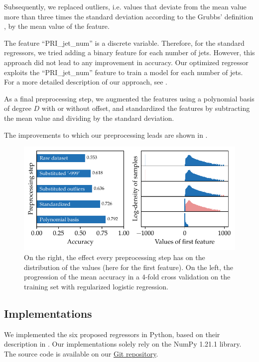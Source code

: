 \documentclass[11pt, a4paper, twocolumn]{article}
\begin{document}
Subsequently, we replaced outliers, i.e. values that deviate  from the mean value more than three times the standard deviation according to the Grubbs' definition \cite{Grubbs69}, by the mean value of the feature. 

The feature  \enquote{PRI\_jet\_num}  is a discrete variable. Therefore, for the standard regressors, we tried adding a binary feature for each number of jets. However, this approach did not lead to any improvement in accuracy.  Our optimized regressor exploits the \enquote{PRI\_jet\_num} feature to train a model for each number of jets. For a more detailed description of our approach, see .

As a final preprocessing step, we augmented the features using a polynomial basis of degree $D$ with or without offset, and standardized the features by subtracting the mean value and dividing by the standard deviation.

The improvements to which our preprocessing leads are shown in .
\begin{figure}[htp]
    \centering
    \includegraphics[width=\columnwidth]{figures/preprocessing.pdf}
    \caption{On the right, the effect every preprocessing step has on the distribution of the values (here for the first feature). On the left, the progression of the mean accuracy in a 4-fold cross validation on the training set with regularized logistic regression.}
    \label{fig:preprocessing}
\end{figure}

\vspace{-8pt}
\subsection{Implementations}
\label{subsec:implementations}

We implemented the six proposed regressors in Python, based on their description
in \cite{jaggi2021}. Our implementations solely rely on the NumPy 1.21.1 library.
The source code is available on our \href{https://github.com/CS-433/ml-project-1-thelearningwolves.git}{Git repository}.
\end{document}
